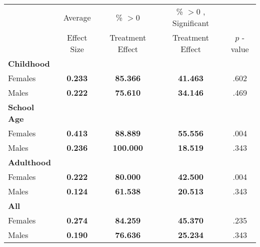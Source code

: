 \begin{tabular}{l c c c c}
\toprule
 & Average & \% $ >0 $ & \% $ >0 $ , Significant & \citet{Rosenbaum_2005_Distribution_JRSS} \\
 & Effect Size & Treatment Effect & Treatment Effect & $ p $ -value \\
\midrule
\textbf{Childhood} & & & & \\
\quad Females &  \textbf{    0.233} & \textbf{   85.366} & \textbf{   41.463} & .602 \\
\quad Males &  \textbf{    0.222} & \textbf{   75.610} & \textbf{   34.146} & .469 \\
\midrule
\textbf{School Age} & & & & \\
\quad Females &  \textbf{    0.413} & \textbf{   88.889} & \textbf{   55.556} & .004 \\
\quad Males &  \textbf{    0.236} & \textbf{  100.000} & \textbf{   18.519} & .343 \\
\midrule
\textbf{Adulthood} & & & & \\
\quad Females &  \textbf{    0.222} & \textbf{   80.000} & \textbf{   42.500} & .004 \\
\quad Males &  \textbf{    0.124} & \textbf{   61.538} & \textbf{   20.513} & .343 \\
\midrule
\textbf{All} & & & & \\
\quad Females &  \textbf{    0.274} & \textbf{   84.259} & \textbf{   45.370} & .235 \\
\quad Males &  \textbf{    0.190} & \textbf{   76.636} & \textbf{   25.234} & .343 \\
\bottomrule
\end{tabular}
